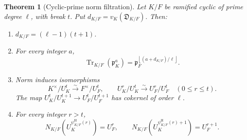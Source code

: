 \documentclass[11pt]{amsart}
\newtheorem{theorem}{Theorem}[section]
\theoremstyle{definition}
\theoremstyle{remark}
\newcommand{\p}{\mathfrak p}
\newcommand{\Tr}{\operatorname{Tr}}
\newcommand{\HerbPsi}{\psi^{\mathrm H}}
\begin{document}
\begin{theorem}[Cyclic-prime norm filtration]\label{thm:norm-filtration}
Let $K/F$ be ramified cyclic of prime degree $\ell$, with break $t$.
Put $d_{K/F}=v_K(\mathfrak D_{K/F})$.  Then:
\begin{enumerate}[label=(\alph*)]
\item $d_{K/F}=(\ell-1)(t+1)$.
\item For every integer $a$,
\begin{equation}\label{eq:trace-ideal}
 \Tr_{K/F}(\p_K^a)=
 \p_F^{\left\lfloor(a+d_{K/F})/\ell\right\rfloor}.
\end{equation}
\item Norm induces isomorphisms
\begin{equation}\label{eq:norm-below-break}
 K^\times/U_K^t\xrightarrow{\sim}F^\times/U_F^t,
 \qquad
 U_K^r/U_K^t\xrightarrow{\sim}U_F^r/U_F^t
 \quad(0\le r\le t).
\end{equation}
The map $U_K^t/U_K^{t+1}\to U_F^t/U_F^{t+1}$ has cokernel of order
$\ell$.
\item For every integer $r>t$,
\begin{equation}\label{eq:norm-above-break}
 N_{K/F}(U_K^{\HerbPsi_{K/F}(r)})=U_F^r,
 \qquad
 N_{K/F}(U_K^{\HerbPsi_{K/F}(r)+1})=U_F^{r+1}.
\end{equation}
\end{enumerate}
\end{theorem}
\end{document}

